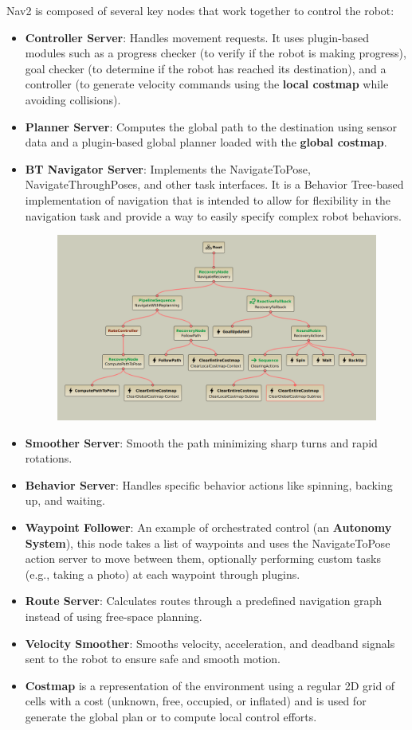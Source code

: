 Nav2 is composed of several key nodes that work together to control the robot:
\begin{itemize}
	\item \textbf{Controller Server}: Handles movement requests. It uses plugin-based modules such as a progress checker (to verify if the robot is making progress), goal checker (to determine if the robot has reached its destination), and a controller (to generate velocity commands using the \textbf{local costmap} while avoiding collisions).
	\item \textbf{Planner Server}: Computes the global path to the destination using sensor data and a  plugin-based global planner loaded with the \textbf{global costmap}.
	\item \textbf{BT Navigator Server}: Implements the NavigateToPose, NavigateThroughPoses, and other task interfaces. It is a Behavior Tree-based implementation of navigation that is intended to allow for flexibility in the navigation task and provide a way to easily specify complex robot behaviors.
	\begin{figure}[h]
		\centering
		\includegraphics[width=0.72\linewidth]{img/bt_nav2_neg.humble.png}
	\end{figure}
	\item \textbf{Smoother Server}: Smooth the path minimizing sharp turns and rapid rotations.
	\item \textbf{Behavior Server}: Handles specific behavior actions like spinning, backing up, and waiting.
	\item \textbf{Waypoint Follower}: An example of orchestrated control (an \textbf{Autonomy System}), this node takes a list of waypoints and uses the NavigateToPose action server to move between them, optionally performing custom tasks (e.g., taking a photo) at each waypoint through plugins.
	\item \textbf{Route Server}: Calculates routes through a predefined navigation graph instead of using free-space planning.
	\item \textbf{Velocity Smoother}: Smooths velocity, acceleration, and deadband signals sent to the robot to ensure safe and smooth motion.
	\item \textbf{Costmap} is a representation of the environment using a regular 2D grid of cells with a cost (unknown, free, occupied, or inflated) and is used for generate the global plan or to compute local control efforts.
\end{itemize}

